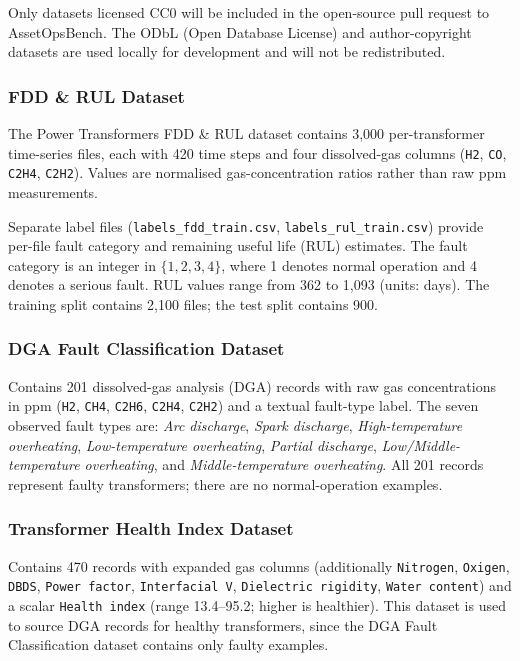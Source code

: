 \noindent
Only datasets licensed CC0 will be included in the open-source pull request
to AssetOpsBench.  The ODbL (Open Database License) and author-copyright
datasets are used locally for development and will not be redistributed.

\subsubsection{FDD \& RUL Dataset}

The Power Transformers FDD \& RUL dataset contains 3{,}000 per-transformer
time-series files, each with 420 time steps and four dissolved-gas columns
(\texttt{H2}, \texttt{CO}, \texttt{C2H4}, \texttt{C2H2}).  Values are
normalised gas-concentration ratios rather than raw ppm measurements.

Separate label files (\texttt{labels\_fdd\_train.csv},
\texttt{labels\_rul\_train.csv}) provide per-file fault category and remaining
useful life (RUL) estimates.  The fault category is an integer in $\{1, 2, 3,
4\}$, where 1 denotes normal operation and 4 denotes a serious fault.  RUL
values range from 362 to 1{,}093 (units: days).  The training split contains
2{,}100 files; the test split contains 900.

\subsubsection{DGA Fault Classification Dataset}

Contains 201 dissolved-gas analysis (DGA) records with raw gas concentrations
in ppm (\texttt{H2}, \texttt{CH4}, \texttt{C2H6}, \texttt{C2H4},
\texttt{C2H2}) and a textual fault-type label.  The seven observed fault types
are: \emph{Arc discharge}, \emph{Spark discharge},
\emph{High-temperature overheating}, \emph{Low-temperature overheating},
\emph{Partial discharge}, \emph{Low/Middle-temperature overheating}, and
\emph{Middle-temperature overheating}.  All 201 records represent faulty
transformers; there are no normal-operation examples.

\subsubsection{Transformer Health Index Dataset}

Contains 470 records with expanded gas columns (additionally \texttt{Nitrogen},
\texttt{Oxigen}, \texttt{DBDS}, \texttt{Power factor}, \texttt{Interfacial V},
\texttt{Dielectric rigidity}, \texttt{Water content}) and a scalar
\texttt{Health index} (range 13.4–95.2; higher is healthier).  This dataset is
used to source DGA records for healthy transformers, since the DGA Fault
Classification dataset contains only faulty examples.

